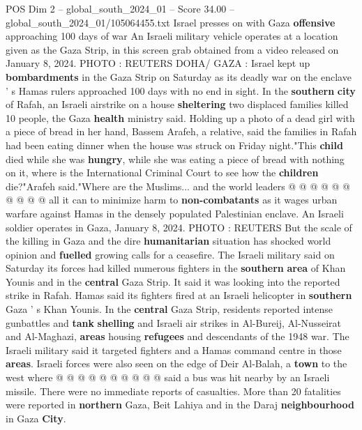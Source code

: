 \begin{textsample}{POS Dim 2 – global\_south\_2024\_01 – Score 34.00 – global\_south\_2024\_01/105064455.txt}  \label{ex:f2_pos_122}
Israel presses on with Gaza \textbf{offensive} approaching 100 days of war An Israeli military vehicle operates at a location given as the Gaza Strip, in this screen grab obtained from a video released on January 8, 2024.
PHOTO : REUTERS DOHA/ GAZA : Israel kept up \textbf{bombardments} in the Gaza Strip on Saturday as its deadly war on the enclave ' s Hamas rulers approached 100 days with no end in sight.
In the \textbf{southern} \textbf{city} of Rafah, an Israeli airstrike on a house \textbf{sheltering} two displaced families killed 10 people, the Gaza \textbf{health} ministry said.
Holding up a photo of a dead girl with a piece of bread in her hand, Bassem Arafeh, a relative, said the families in Rafah had been eating dinner when the house was struck on Friday night."This \textbf{child} died while she was \textbf{hungry}, while she was eating a piece of bread with nothing on it, where is the International Criminal Court to see how the \textbf{children} die?"Arafeh said."Where are the Muslims... and the world leaders @ @ @ @ @ @ @ @ @ @ all it can to minimize harm to \textbf{non-combatants} as it wages urban warfare against Hamas in the densely populated Palestinian enclave.
An Israeli soldier operates in Gaza, January 8, 2024.
PHOTO : REUTERS But the scale of the killing in Gaza and the dire \textbf{humanitarian} situation has shocked world opinion and \textbf{fuelled} growing calls for a ceasefire.
The Israeli military said on Saturday its forces had killed numerous fighters in the \textbf{southern} \textbf{area} of Khan Younis and in the \textbf{central} Gaza Strip.
It said it was looking into the reported strike in Rafah.
Hamas said its fighters fired at an Israeli helicopter in \textbf{southern} Gaza ' s Khan Younis.
In the \textbf{central} Gaza Strip, residents reported intense gunbattles and \textbf{tank} \textbf{shelling} and Israeli air strikes in Al-Bureij, Al-Nusseirat and Al-Maghazi, \textbf{areas} housing \textbf{refugees} and descendants of the 1948 war.
The Israeli military said it targeted fighters and a Hamas command centre in those \textbf{areas}.
Israeli forces were also seen on the edge of Deir Al-Balah, a \textbf{town} to the west where @ @ @ @ @ @ @ @ @ @ said a bus was hit nearby by an Israeli missile.
There were no immediate reports of casualties.
More than 20 fatalities were reported in \textbf{northern} Gaza, Beit Lahiya and in the Daraj \textbf{neighbourhood} in Gaza \textbf{City}.

\end{textsample}
